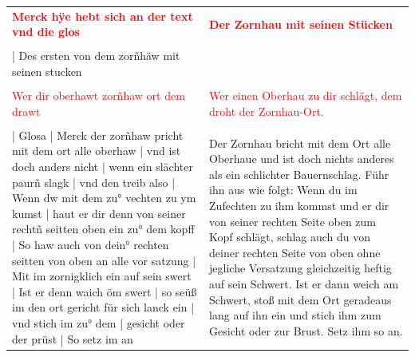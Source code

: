 \begin{longtable}{p{6.25cm}p{6.25cm}}
\textbf{\textcolor{red}{Merck hÿe hebt sich an der text vnd die glos}}
&
\textbf{\textcolor{red}{Der Zornhau mit seinen Stücken}}
\\
\\
| Des ersten von dem zorñhäw mit seinen stucken
&

\\
\\
\textcolor{red}{Wer dir oberhawt zorñhaw ort dem drawt}
&
\textcolor{red}{Wer einen Oberhau zu dir schlägt, dem droht der Zornhau-Ort.}
\\
\\
| Glosa | Merck der zorñhaw pricht mit dem ort alle oberhaw | vnd ist doch anders nicht | wenn ein slächter paurñ slagk | vnd den treib also | Wenn dw mit dem zu° vechten zu ym kumst | haut er dir denn von seiner rechtñ seitten oben ein zu° dem kopff | So haw auch von dein° rechten seitten von oben an alle vor satzung | Mit im zornigklich ein auf sein swert | Ist er denn waich öm swert | so seüß im den ort gericht für sich lanck ein | vnd stich im zu° dem | gesicht oder der prüst | So setz im an
&
Der Zornhau bricht mit dem Ort alle Oberhaue und ist doch nichts anderes als ein schlichter Bauernschlag. Führ ihn aus wie folgt: Wenn du im Zufechten zu ihm kommst und er dir von seiner rechten Seite oben zum Kopf schlägt, schlag auch du von deiner rechten Seite von oben ohne jegliche Versatzung gleichzeitig heftig auf sein Schwert. Ist er dann weich am Schwert, stoß mit dem Ort geradeaus lang auf ihn ein und stich ihm zum Gesicht oder zur Brust. Setz ihm so an.
\end{longtable}

\newpage

\begin{center}
\end{center}

\newpage

